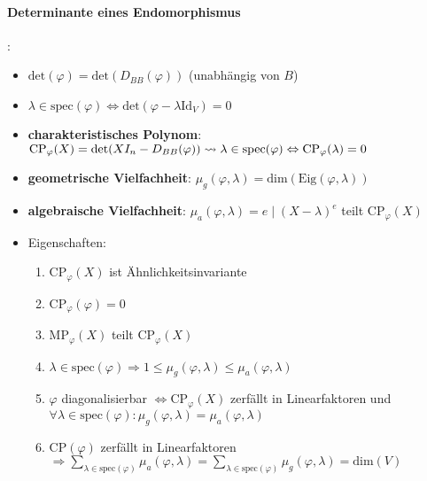 \paragraph{Determinante eines Endomorphismus}:
\begin{itemize}
	\item $\text{det}(\varphi) = \text{det}(D_{BB}(\varphi))$ (unabhängig von $B$)
	\item $\lambda \in \text{spec}(\varphi) \Leftrightarrow \text{det}(\varphi - \lambda \text{Id}_V) = 0$
	\item \textbf{charakteristisches Polynom}: $\text{CP}_\varphi(X)=\text{det}(XI_n - D_{BB}(\varphi)) \\* \leadsto \lambda \in \text{spec}(\varphi) \Leftrightarrow \text{CP}_\varphi(\lambda)=0$
	\item \textbf{geometrische Vielfachheit}: $\mu_g(\varphi, \lambda) = \text{dim}(\text{Eig}(\varphi, \lambda))$
	\item \textbf{algebraische Vielfachheit}: $\mu_a(\varphi, \lambda) = e \mid (X-\lambda)^e$ teilt $\text{CP}_\varphi(X)$
	\item Eigenschaften:
	\begin{enumerate}
		\item $\text{CP}_\varphi(X)$ ist Ähnlichkeitsinvariante
		\item $\text{CP}_\varphi(\varphi) = 0$
		\item $\text{MP}_\varphi(X)$ teilt $\text{CP}_\varphi(X)$
		\item $\lambda \in \text{spec}(\varphi) \Rightarrow 1 \leq \mu_g(\varphi, \lambda) \leq \mu_a(\varphi, \lambda)$
		\item $\varphi$ diagonalisierbar $\Leftrightarrow \text{CP}_\varphi(X)$ zerfällt in Linearfaktoren und $\forall \lambda \in \text{spec}(\varphi): \mu_g(\varphi, \lambda) = \mu_a(\varphi, \lambda)$
		\item $\text{CP}(\varphi)$ zerfällt in Linearfaktoren $\Rightarrow \sum_{\lambda \in \text{spec}(\varphi)} \mu_a(\varphi, \lambda) = \sum_{\lambda \in \text{spec}(\varphi)} \mu_g(\varphi, \lambda) = \text{dim}(V)$
	\end{enumerate}
\end{itemize}